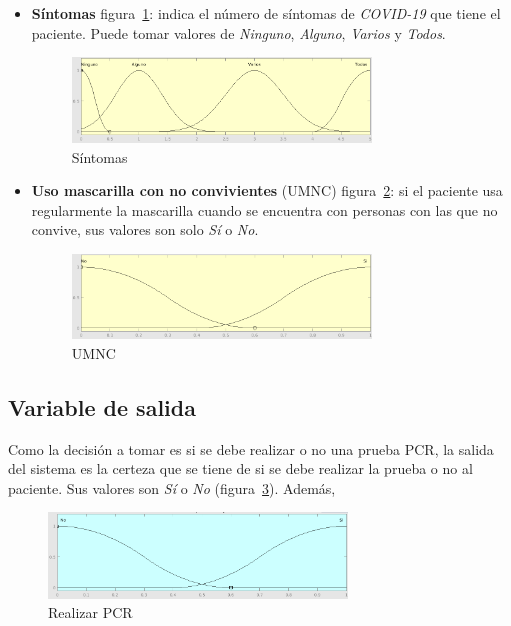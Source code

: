 \documentclass[12pt,a4paper, xcolor=table]{article}
\begin{document}
\begin{itemize}
  \item \textbf{Síntomas} figura~\ref{Sintomas}: indica el número de síntomas de \textit{COVID-19} que tiene el paciente. Puede tomar valores de \textit{Ninguno}, \textit{Alguno}, \textit{Varios} y \textit{Todos}.

  \begin{figure}[!h]
      \centering
      \includegraphics[width=300px]{img/sintomas.png}
      \caption{Síntomas}
      \label{Sintomas}
  \end{figure}

  \item \textbf{Uso mascarilla con no convivientes} (UMNC) figura~\ref{UMNC}: si el paciente usa regularmente la mascarilla cuando se encuentra con personas con las que no convive, sus valores son solo \textit{Sí} o \textit{No}.

  \begin{figure}[!h]
      \centering
      \includegraphics[width=300px]{img/uso_mascarilla.png}
      \caption{UMNC}
      \label{UMNC}
  \end{figure}

\end{itemize}



\subsection{Variable de salida}

Como la decisión a tomar es si se debe realizar o no una prueba PCR, la salida del sistema es la certeza que se tiene de si se debe realizar la prueba o no al paciente. Sus valores son \textit{Sí} o \textit{No} (figura~\ref{realizarPCR}). Además,

\begin{figure}[!h]
    \centering
    \includegraphics[width=300px]{img/realizar_pcr.png}
    \caption{Realizar PCR}
    \label{realizarPCR}
\end{figure}
\end{document}
